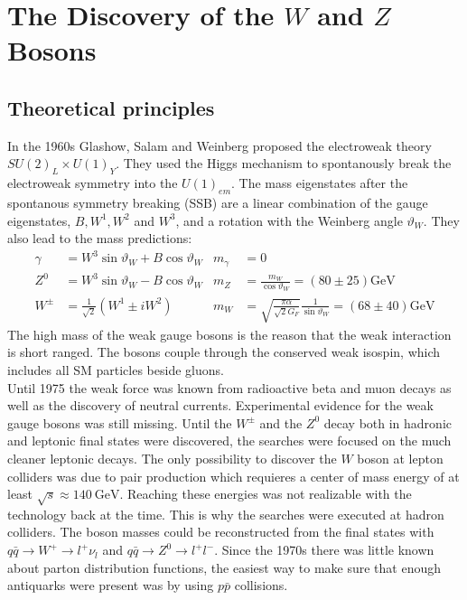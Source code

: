 \section{The Discovery of the $W$ and $Z$ Bosons \cite{wz}}
\subsection{Theoretical principles}
In the 1960s Glashow, Salam and Weinberg proposed the electroweak theory $SU(2)_L\times U(1)_Y$. They used the Higgs mechanism to spontanously break the electroweak symmetry into the $U(1)_{em}$. The mass eigenstates after the spontanous symmetry breaking (SSB) are a linear combination of the gauge eigenstates, $B, W^1, W^2$ and $W^3$, and a rotation with the Weinberg angle $\vartheta_W$. They also lead to the mass predictions:
\begin{align*}
	\gamma &= W^3\sin \vartheta_W + B \cos \vartheta_W & m_{\gamma} &= 0\\
	Z^0 &= W^3\sin \vartheta_W - B \cos \vartheta_W & m_Z &= \frac{m_W}{\cos\vartheta_W} = (80\pm25)\si{\GeV}\\
	W^{\pm} &= \frac{1}{\sqrt{2}}(W^1 \pm iW^2) & m_W &= \sqrt{\frac{\pi\alpha}{\sqrt{2}G_F}}\frac{1}{\sin\vartheta_W} = (68\pm40)\si{\GeV}
\end{align*}
The high mass of the weak gauge bosons is the reason that the weak interaction is short ranged. The bosons couple through the conserved weak isospin, which includes all SM particles beside gluons. \\
Until 1975 the weak force was known from radioactive beta and muon decays as well as the discovery of neutral currents. Experimental evidence for the weak gauge bosons was still missing. Until the $W^{\pm}$ and the $Z^0$ decay both in hadronic and leptonic final states were discovered, the searches were focused on the much cleaner leptonic decays. The only possibility to discover the $W$ boson at lepton colliders was due to pair production which requieres a center of mass energy of at least $\sqrt{s}\approx \SI{140}{\giga\electronvolt}$. Reaching these energies was not realizable with the technology back at the time. This is why the searches were executed at hadron colliders. The boson masses could be reconstructed from the final states with $q\bar{q} \rightarrow W^{+} \rightarrow l^+\nu_l$ and $q\bar{q} \rightarrow Z^{0} \rightarrow l^+l^-$. Since the 1970s there was little known about parton distribution functions, the easiest way to make sure that enough antiquarks were present was by using $p\bar{p}$ collisions.

